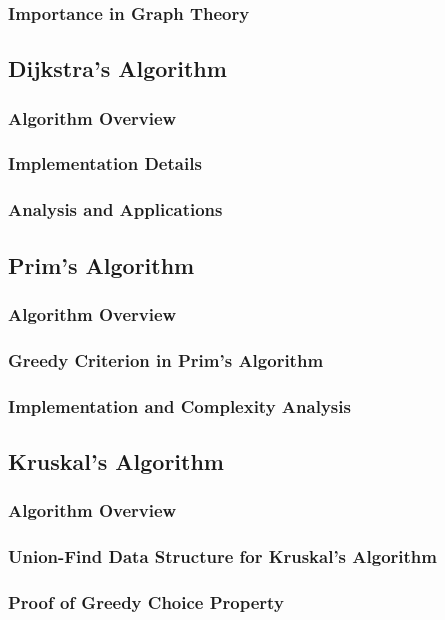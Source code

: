 \documentclass[12pt]{book} %
\begin{document}
\subsubsection{Importance in Graph Theory}

\subsection{Dijkstra's Algorithm}
\subsubsection{Algorithm Overview}
\subsubsection{Implementation Details}
\subsubsection{Analysis and Applications}

\subsection{Prim's Algorithm}
\subsubsection{Algorithm Overview}
\subsubsection{Greedy Criterion in Prim's Algorithm}
\subsubsection{Implementation and Complexity Analysis}

\subsection{Kruskal's Algorithm}
\subsubsection{Algorithm Overview}
\subsubsection{Union-Find Data Structure for Kruskal's Algorithm}
\subsubsection{Proof of Greedy Choice Property}
\end{document}

